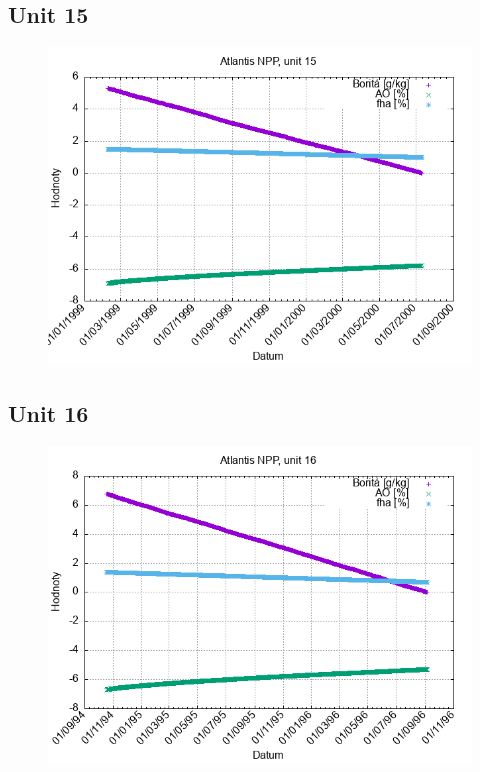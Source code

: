 \documentclass{article}
\begin{document}
\subsection*{Unit 15}
\begin{figure}[h!]
\centering
\includegraphics[width=14cm]{./grafy/Atlantis15.png}
\end{figure}
\clearpage
\subsection*{Unit 16}
\begin{figure}[h!]
\centering
\includegraphics[width=14cm]{./grafy/Atlantis16.png}
\end{figure}
\clearpage
\end{document}
